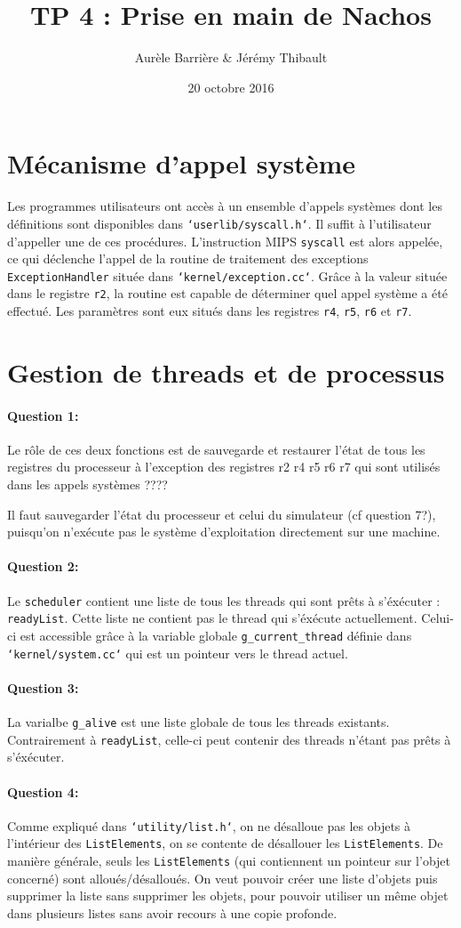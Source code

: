 \documentclass[11pt]{article}
\title{TP 4 : Prise en main de Nachos}
\author{Aurèle Barrière \& Jérémy Thibault}
\date{20 octobre 2016}
\def\question#1{\paragraph{Question #1:}}
\def\pathfile#1{\texttt{`#1`}}
\def\var#1{\texttt{#1}}
\def\func#1{\texttt{#1}}
\def\obj#1{\texttt{#1}}
\def\comment#1{\color{red}#1\color{black}}
\begin{document}
\maketitle

\section{Mécanisme d'appel système}

Les programmes utilisateurs ont accès à un ensemble d'appels systèmes dont les définitions sont disponibles dans \pathfile{userlib/syscall.h}. Il suffit à l'utilisateur d'appeller une de ces procédures.
L'instruction MIPS \func{syscall} est alors appelée, ce qui déclenche l'appel de la routine de traitement des exceptions \func{ExceptionHandler} située dans \pathfile{kernel/exception.cc}. Grâce à la valeur située dans le registre \var{r2}, la routine est capable de déterminer quel appel système a été effectué. Les paramètres sont eux situés dans les registres \var{r4}, \var{r5}, \var{r6} et \var{r7}.


\section{Gestion de threads et de processus}
\question{1} Le rôle de ces deux fonctions est de sauvegarde et restaurer l'état de tous les registres du processeur \comment{à l'exception des registres r2 r4 r5 r6 r7 qui sont utilisés dans les appels systèmes ????}

Il faut sauvegarder l'état du processeur et celui du simulateur \comment{(cf question 7?)}, puisqu'on n'exécute pas le système d'exploitation directement sur une machine.

\question{2} Le \obj{scheduler} contient une liste de tous les threads qui sont prêts à s'éxécuter : \var{readyList}. Cette liste ne contient pas le thread qui s'éxécute actuellement. Celui-ci est accessible grâce à la variable globale \var{g\_current\_thread} définie dans \pathfile{kernel/system.cc} qui est un pointeur vers le thread actuel.

\question{3} La varialbe \var{g\_alive} est une liste globale de tous les threads existants. Contrairement à \var{readyList}, celle-ci peut contenir des threads n'étant pas prêts à s'éxécuter.

\question{4} 
Comme expliqué dans \pathfile{utility/list.h}, on ne désalloue pas les objets à l'intérieur des \obj{ListElements}, on se contente de désallouer les \obj{ListElements}. De manière générale, seuls les \obj{ListElements} (qui contiennent un pointeur sur l'objet concerné) sont alloués/désalloués. On veut pouvoir créer une liste d'objets puis supprimer la liste sans supprimer les objets, pour pouvoir utiliser un même objet dans plusieurs listes sans avoir recours à une copie profonde.
\end{document}
